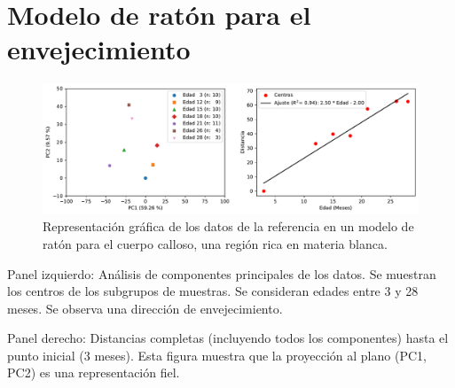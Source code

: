 \chapter{Modelo de ratón para el envejecimiento}
\label{apx:apx1}

\begin{figure}[!htb]
	\centering
	\includegraphics[width=\linewidth]{figures/suppl_fig_1}
	\caption{Representación gráfica de los datos de la referencia \cite{hahn2023atlas} en un modelo de ratón para el cuerpo calloso, una región rica en materia blanca.}
	\label{fig:suppl1}
\end{figure}

Panel izquierdo: Análisis de componentes principales de los datos. Se muestran los centros de los subgrupos de muestras. Se consideran edades entre 3 y 28 meses. Se observa una dirección de envejecimiento.

Panel derecho: Distancias completas (incluyendo todos los componentes) hasta el punto inicial (3 meses). Esta figura muestra que la proyección al plano (PC1, PC2) es una representación fiel.

